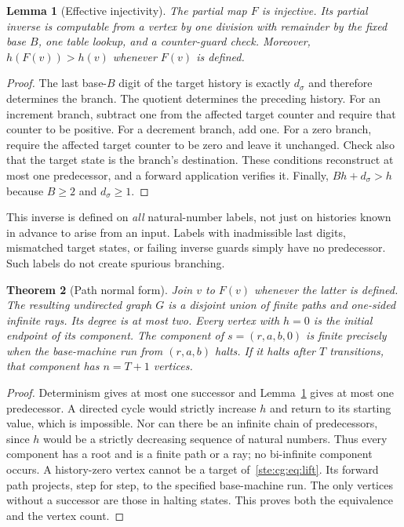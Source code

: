 \documentclass[11pt,letterpaper]{article}
\newtheorem{theorem}{Theorem}[section]
\newtheorem{lemma}[theorem]{Lemma}
\theoremstyle{definition}
\theoremstyle{remark}
\begin{document}
\begin{lemma}[Effective injectivity]\label{ste:cg:lem:injective}
The partial map $F$ is injective. Its partial inverse is computable from a
vertex by one division with remainder by the fixed base $B$, one table
lookup, and a counter-guard check. Moreover, $h(F(v))>h(v)$ whenever $F(v)$
is defined.
\end{lemma}
\begin{proof}
The last base-$B$ digit of the target history is exactly $d_\sigma$ and
therefore determines the branch. The quotient determines the preceding
history. For an increment branch, subtract one from the affected target
counter and require that counter to be positive. For a decrement branch,
add one. For a zero branch, require the affected target counter to be zero
and leave it unchanged. Check also that the target state is the branch's
destination. These conditions reconstruct at most one predecessor, and a
forward application verifies it. Finally,
$Bh+d_\sigma>h$ because $B\ge2$ and $d_\sigma\ge1$.
\end{proof}

This inverse is defined on \emph{all} natural-number labels, not just on
histories known in advance to arise from an input. Labels with inadmissible
last digits, mismatched target states, or failing inverse guards simply
have no predecessor. Such labels do not create spurious branching.

\begin{theorem}[Path normal form]\label{ste:cg:thm:paths}
Join $v$ to $F(v)$ whenever the latter is defined. The resulting undirected
graph $G$ is a disjoint union of finite paths and one-sided infinite rays.
Its degree is at most two. Every vertex with $h=0$ is the initial endpoint
of its component. The component of $s=(r,a,b,0)$ is finite precisely when
the base-machine run from $(r,a,b)$ halts. If it halts after $T$ transitions,
that component has $n=T+1$ vertices.
\end{theorem}
\begin{proof}
Determinism gives at most one successor and Lemma~\ref{ste:cg:lem:injective} gives
at most one predecessor. A directed cycle would strictly increase $h$ and
return to its starting value, which is impossible. Nor can there be an
infinite chain of predecessors, since $h$ would be a strictly decreasing
sequence of natural numbers. Thus every component has a root and is a
finite path or a ray; no bi-infinite component occurs. A history-zero vertex
cannot be a target of~\eqref{ste:cg:eq:lift}. Its forward path projects, step for
step, to the specified base-machine run. The only vertices without a
successor are those in halting states. This proves both the equivalence
and the vertex count.
\end{proof}
\end{document}
